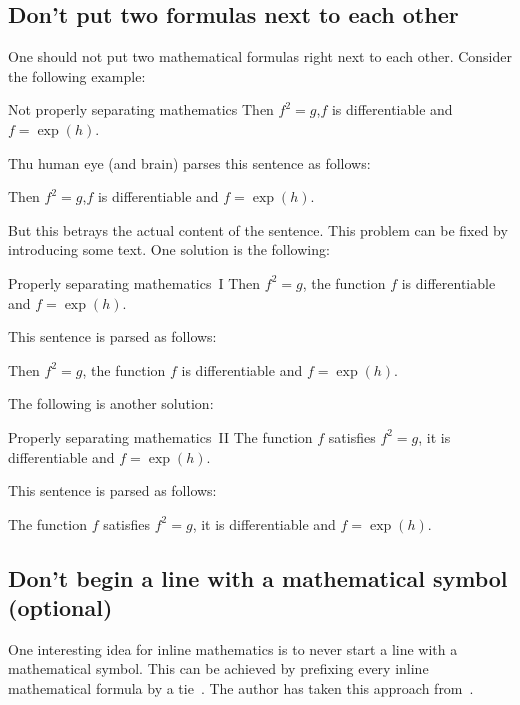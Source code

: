 \subsection{Don’t put two formulas next to each other}

One should not put two mathematical formulas right next to each other.
Consider the following example:
\begin{showlatex}{Not properly separating mathematics}
Then $f^2 = g$,$f$ is differentiable and $f = \exp(h)$.
\end{showlatex}
Thu human eye (and brain) parses this sentence as follows:
\begin{center}
  Then
  \quad
  $f^2 = g$,$f$
  \quad
  is differentiable and
  \quad
  $f = \exp(h)$.
\end{center}
But this betrays the actual content of the sentence.
This problem can be fixed by introducing some text.
One solution is the following:
\begin{showlatex}{Properly separating mathematics~I}
Then $f^2 = g$, the function $f$ is differentiable and $f = \exp(h)$.
\end{showlatex}
This sentence is parsed as follows:
\begin{center}
  Then
  \quad
  $f^2 = g$,
  \quad
  the function
  \quad
  $f$
  \quad
  is differentiable and
  \quad
  $f = \exp(h)$.
\end{center}
The following is another solution:
\begin{showlatex}{Properly separating mathematics~II}
The function $f$ satisfies $f^2 = g$, it is differentiable and $f = \exp(h)$.
\end{showlatex}
This sentence is parsed as follows:
\begin{center}
  The function
  \quad
  $f$
  \quad
  satisfies
  \quad
  $f^2 = g$,
  \quad
  it is differentiable and
  \quad
  $f = \exp(h)$.
\end{center}



\subsection{Don’t begin a line with a mathematical symbol (optional)}

One interesting idea for inline mathematics is to never start a line with a mathematical symbol.
This can be achieved by prefixing every inline mathematical formula by a tie~\inlinecode{\customtexttilde}.
The author has taken this approach from~\cite{nomath_at_line}.





